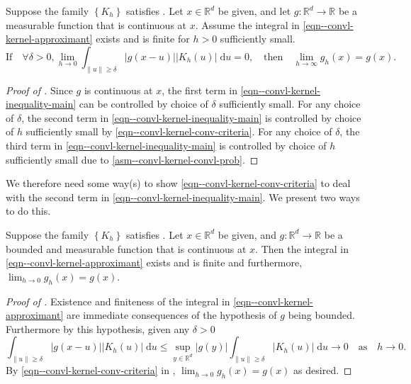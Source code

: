 \begin{lemma}
\label{lem--convl-kernel-conv-criteria}
Suppose the family \(\left\{ K_{h} \right\}\) satisfies
.
Let \(x \in \mathbb{R}^{d}\) be given, and let \(g : \mathbb{R}^{d} \to
\mathbb{R}\) be a measurable function that is continuous at \(x\).
Assume the integral in \eqref{eqn--convl-kernel-approximant} exists and is
finite for \(h > 0\) sufficiently small.
\begin{equation}
  \text{If} \quad
  \forall \delta > 0, \lim_{h \to 0} \int_{\|u\| \geq \delta} |g
  (x - u)| \left| K_{h} (u) \right| \; \mathrm{d} u = 0,
  \quad \text{then} \quad
  \lim_{h \to \infty} g_{h} (x) = g (x).
  \label{eqn--convl-kernel-conv-criteria}
\end{equation}
\end{lemma}

\begin{proof}[Proof of ]
Since \(g\) is continuous at \(x\), the first term in
\eqref{eqn--convl-kernel-inequality-main} can be controlled by choice of
\(\delta\) sufficiently small.
For any choice of \(\delta\), the second term in
\eqref{eqn--convl-kernel-inequality-main} is controlled by choice of \(h\)
sufficiently small by
\eqref{eqn--convl-kernel-conv-criteria}.
For any choice of \(\delta\), the third term in
\eqref{eqn--convl-kernel-inequality-main} is controlled by choice of \(h\)
sufficiently small due to 
\ref{asm--convl-kernel-convl-prob}.
\end{proof}

We therefore need some way(s) to show \eqref{eqn--convl-kernel-conv-criteria} to
deal with the second term in \eqref{eqn--convl-kernel-inequality-main}.
We present two ways to do this.


\begin{theorem}
\label{thm--convl-kernel-conv-bounded}
Suppose the family \(\left\{ K_{h} \right\}\) satisfies
.
Let \(x \in \mathbb{R}^{d}\) be given, and \(g : \mathbb{R}^{d} \to \mathbb{R}\)
be a bounded and measurable function that is continuous at \(x\).
Then the integral in \eqref{eqn--convl-kernel-approximant} exists and is finite
and furthermore, \(\lim_{h \to 0} g_{h} (x) = g (x)\).
\end{theorem}

\begin{proof}[Proof of ]
Existence and finiteness of the integral in
\eqref{eqn--convl-kernel-approximant} are immediate consequences of the
hypothesis of \(g\) being bounded.
Furthermore by this hypothesis, given any \(\delta > 0\)
\begin{equation*}
  \int_{\|u\| \geq \delta} |g (x - u)| \left| K_{h} (u) \right| \; \mathrm{d} u
  \leq \sup_{y \in \mathbb{R}^{d}} |g (y)| \int_{\|u\| \geq \delta}
  \left| K_{h} (u) \right| \; \mathrm{d} u \to 0 \quad \text{as} \quad h \to 0.
\end{equation*}
By \eqref{eqn--convl-kernel-conv-criteria} in
, \(\lim_{h \to 0} g_{h} (x) = g (x)\) as
desired.
\end{proof}

